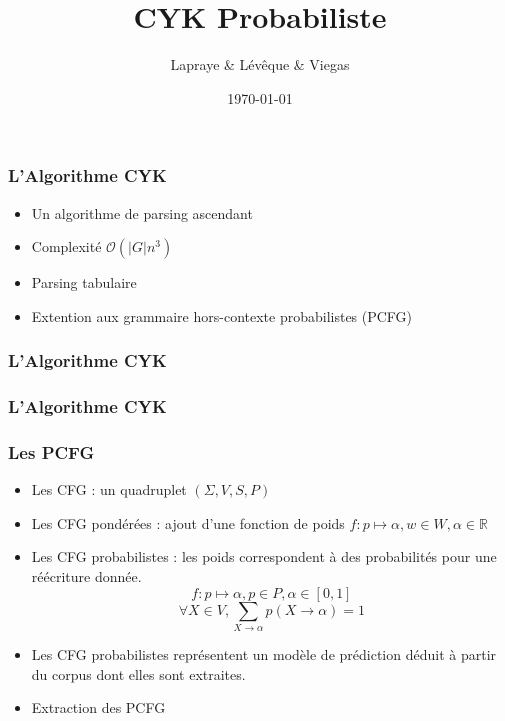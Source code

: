 \documentclass{beamer}
\begin{document}
\title{CYK Probabiliste}  %
\author{Lapraye \& Lévêque \& Viegas}

\date{\today}


\begin{frame}
 \maketitle
\end{frame}

\begin{frame}
\frametitle{L'Algorithme CYK}
\begin{itemize}%
  \item<1-4>{Un algorithme de parsing ascendant}
  \item<2-4>{Complexité $\mathcal{O}(|G|n^3) $ } %
  \item<3-4>{Parsing tabulaire}
  \item<4>{Extention aux grammaire hors-contexte probabilistes (PCFG)}
 \end{itemize}
 
\end{frame}

\begin{frame}
\frametitle{L'Algorithme CYK}
 
\end{frame}


\begin{frame}
 \frametitle{L'Algorithme CYK}

\end{frame}

\begin{frame}
 \frametitle{Les PCFG}
 \begin{itemize}
  \item<1-5>{Les CFG : un quadruplet $(\Sigma,V,S,P)$ }
  \item<2>{Les CFG pondérées : ajout d'une fonction de poids $ f : p \mapsto \alpha, w \in W, \alpha \in \mathbb{R} $ }
  \item<3-5>{Les CFG probabilistes : les poids correspondent à des probabilités pour une réécriture donnée.  
  $$ f : p \mapsto \alpha, p \in P, \alpha \in [0,1]$$ $$ \forall X \in V, \sum_{X\to\alpha}p(X\to\alpha)=1 $$ }
  \item<4-5>{Les CFG probabilistes représentent un modèle de prédiction déduit à partir du corpus dont elles sont extraites.}
  \item<5>{Extraction des PCFG}
 \end{itemize}

\end{frame}
\end{document}
